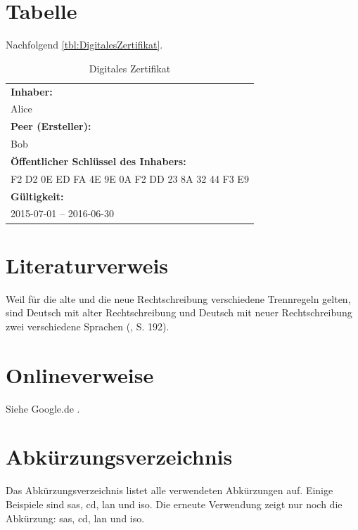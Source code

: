 \section{Tabelle}

Nachfolgend \autoref{tbl:DigitalesZertifikat}.

\begin{table}[H]
	\begin{center}
		\renewcommand{\arraystretch}{1.3}
		\begin{tabular}{|l|}
			\hline
			\textbf{Inhaber:}\\
			Alice \\ \hline
			\textbf{Peer (Ersteller):}\\
			Bob \\ \hline
			\textbf{Öffentlicher Schlüssel des Inhabers:}\\
			F2 D2 0E ED FA 4E 9E 0A F2 DD 23 8A 32 44 F3 E9 \\ \hline
			\textbf{Gültigkeit:}\\
			2015-07-01 – 2016-06-30 \\ \hline
		\end{tabular}
	\end{center}
	\caption{Digitales Zertifikat}
	\label{tbl:DigitalesZertifikat}
\end{table}

\section{Literaturverweis}

Weil für die alte und die neue Rechtschreibung verschiedene Trennregeln gelten, sind Deutsch mit alter Rechtschreibung und Deutsch mit neuer Rechtschreibung zwei verschiedene Sprachen (\cite{Knappen2009}, S. 192).

\section{Onlineverweise}

Siehe Google.de \cite{Google2015}.

\section{Abkürzungsverzeichnis}
Das Abkürzungsverzeichnis listet alle verwendeten Abkürzungen auf. Einige Beispiele sind \gls{sas}, \gls{cd}, \gls{lan} und \gls{iso}. Die erneute Verwendung zeigt nur noch die Abkürzung: \gls{sas}, \gls{cd}, \gls{lan} und \gls{iso}.
